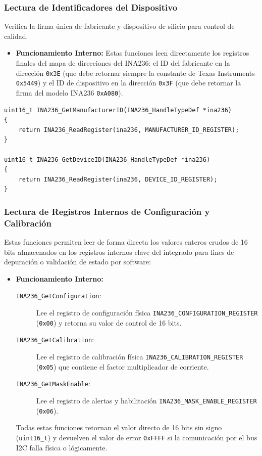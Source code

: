 \documentclass[
10pt, %
a4paper, %
oneside, %
headinclude,footinclude, %
BCOR5mm, %
]{scrartcl}
\begin{document}
\subsubsection{Lectura de Identificadores del Dispositivo}
Verifica la firma única de fabricante y dispositivo de silicio para control de calidad.

\begin{itemize}
	\item \textbf{Funcionamiento Interno:}
		Estas funciones leen directamente los registros finales del mapa de direcciones del INA236: el ID del fabricante en la dirección \texttt{0x3E} (que debe retornar siempre la constante de Texas Instruments \texttt{0x5449}) y el ID de dispositivo en la dirección \texttt{0x3F} (que debe retornar la firma del modelo INA236 \texttt{0xA080}).
\end{itemize}

\begin{lstlisting}[style=CMakeStyle]
uint16_t INA236_GetManufacturerID(INA236_HandleTypeDef *ina236)
{
    return INA236_ReadRegister(ina236, MANUFACTURER_ID_REGISTER);
}

uint16_t INA236_GetDeviceID(INA236_HandleTypeDef *ina236)
{
    return INA236_ReadRegister(ina236, DEVICE_ID_REGISTER);
}
\end{lstlisting}

\subsubsection{Lectura de Registros Internos de Configuración y Calibración}
Estas funciones permiten leer de forma directa los valores enteros crudos de 16 bits almacenados en los registros internos clave del integrado para fines de depuración o validación de estado por software:
\begin{itemize}
	\item \textbf{Funcionamiento Interno:}
		\begin{description}
			\item[\texttt{INA236\_GetConfiguration}:] Lee el registro de configuración física \texttt{INA236\_CONFIGURATION\_REGISTER} (\texttt{0x00}) y retorna su valor de control de 16 bits.
			\item[\texttt{INA236\_GetCalibration}:] Lee el registro de calibración física \texttt{INA236\_CALIBRATION\_REGISTER} (\texttt{0x05}) que contiene el factor multiplicador de corriente.
			\item[\texttt{INA236\_GetMaskEnable}:] Lee el registro de alertas y habilitación \texttt{INA236\_MASK\_ENABLE\_REGISTER} (\texttt{0x06}).
		\end{description}
		Todas estas funciones retornan el valor directo de 16 bits sin signo (\texttt{uint16\_t}) y devuelven el valor de error \texttt{0xFFFF} si la comunicación por el bus I2C falla física o lógicamente.
\end{itemize}
\end{document}
